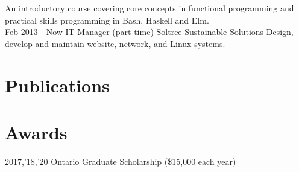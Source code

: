 \documentclass[letterpaper]{twentysecondcv} %
\begin{document}
\begin{twenty}
  {}
  {An introductory course covering core concepts in functional programming and practical skills programming in Bash, Haskell and Elm.
}
	\\
	\twentyitem
	{Feb 2013 -}
	{Now}
	{IT Manager (part-time)}
	{\href{http://www.soltree.net/}{Soltree Sustainable Solutions}}
	{}
  {Design, develop and maintain website, network, and Linux systems.}
\end{twenty}
\section{Publications}
\vspace{-.5em}
\printbibliography[heading=none]
\section{Awards}

\vspace{-.5em}
\begin{twenty}
  \twentyitem
  {2017,'18,'20}
  {}
  {Ontario Graduate Scholarship \textnormal{(\$15,000 each year)}}
	{}
	{}
	{}
%
%	
\end{twenty}
\end{document}
